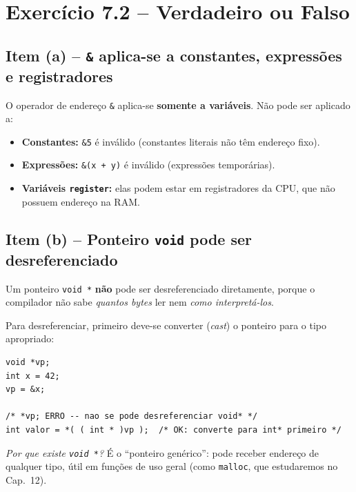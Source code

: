 \documentclass[12pt,a4paper]{article}
\begin{document}
\section{Exercício 7.2 -- Verdadeiro ou Falso}

\subsection*{Item (a) -- \texttt{\&} aplica-se a constantes, expressões e registradores}

\begin{tcolorbox}[colback=red!5,colframe=deitelred,title={\bfseries FALSO}]
O operador de endereço \texttt{\&} aplica-se \textbf{somente a variáveis}.
Não pode ser aplicado a:
\begin{itemize}[noitemsep]
  \item \textbf{Constantes:} \texttt{\&5} é inválido (constantes literais não têm endereço fixo).
  \item \textbf{Expressões:} \texttt{\&(x + y)} é inválido (expressões temporárias).
  \item \textbf{Variáveis \texttt{register}:} elas podem estar em registradores da
  CPU, que não possuem endereço na RAM.
\end{itemize}
\end{tcolorbox}

\subsection*{Item (b) -- Ponteiro \texttt{void} pode ser desreferenciado}

\begin{tcolorbox}[colback=red!5,colframe=deitelred,title={\bfseries FALSO}]
Um ponteiro \texttt{void *} \textbf{não} pode ser desreferenciado diretamente,
porque o compilador não sabe \textit{quantos bytes} ler nem \textit{como interpretá-los}.

Para desreferenciar, primeiro deve-se converter (\textit{cast}) o ponteiro para
o tipo apropriado:
\begin{lstlisting}
void *vp;
int x = 42;
vp = &x;

/* *vp; ERRO -- nao se pode desreferenciar void* */
int valor = *( ( int * )vp );  /* OK: converte para int* primeiro */
\end{lstlisting}

\textit{Por que existe \texttt{void *}?} É o ``ponteiro genérico'': pode receber
endereço de qualquer tipo, útil em funções de uso geral (como \texttt{malloc}, que
estudaremos no Cap.~12).
\end{tcolorbox}
\end{document}
